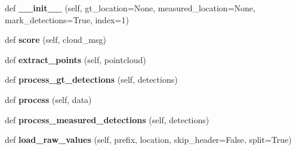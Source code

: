 \begin{DoxyCompactItemize}
\item 
\mbox{\label{classgr__ml_1_1gr__terrain__recognition_1_1analyze__and__score_1_1DetectionsScore_a12123a3afe4f977a74d41420e45777c6}} 
def {\bfseries \+\_\+\+\_\+init\+\_\+\+\_\+} (self, gt\+\_\+location=None, measured\+\_\+location=None, mark\+\_\+detections=True, index=1)
\item 
\mbox{\label{classgr__ml_1_1gr__terrain__recognition_1_1analyze__and__score_1_1DetectionsScore_ae277f8590c27157dc01b38503c18bc2f}} 
def {\bfseries score} (self, cloud\+\_\+msg)
\item 
\mbox{\label{classgr__ml_1_1gr__terrain__recognition_1_1analyze__and__score_1_1DetectionsScore_a8751da3f9c5b07f25e56dc213de25482}} 
def {\bfseries extract\+\_\+points} (self, pointcloud)
\item 
\mbox{\label{classgr__ml_1_1gr__terrain__recognition_1_1analyze__and__score_1_1DetectionsScore_a3ea2c8304bee96d3fe73720ed0d3be25}} 
def {\bfseries process\+\_\+gt\+\_\+detections} (self, detections)
\item 
\mbox{\label{classgr__ml_1_1gr__terrain__recognition_1_1analyze__and__score_1_1DetectionsScore_a82b35f7f638ffd86d840d984df8d8f28}} 
def {\bfseries process} (self, data)
\item 
\mbox{\label{classgr__ml_1_1gr__terrain__recognition_1_1analyze__and__score_1_1DetectionsScore_a9719ac906a54ca634aee2ae5ed8e2e89}} 
def {\bfseries process\+\_\+measured\+\_\+detections} (self, detections)
\item 
\mbox{\label{classgr__ml_1_1gr__terrain__recognition_1_1analyze__and__score_1_1DetectionsScore_aa74bb686e7a937cb89af99fe4d920602}} 
def {\bfseries load\+\_\+raw\+\_\+values} (self, prefix, location, skip\+\_\+header=False, split=True)
\end{DoxyCompactItemize}
